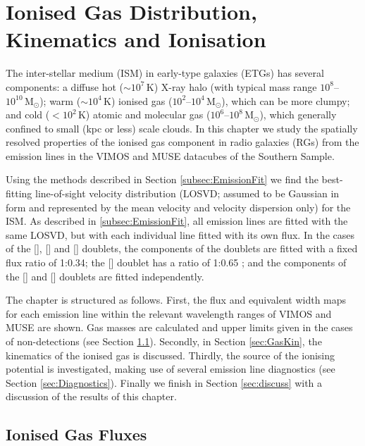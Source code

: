 \chapter{Ionised Gas Distribution, Kinematics and Ionisation}
	\label{cha:gas}
The inter-stellar medium (ISM) in early-type galaxies (ETGs) has several components: a diffuse hot ($\sim 10^7 \, \mathrm{K}$) X-ray halo (with typical mass range $10^8$--$10^{10} \, \mathrm{M_\odot}$); warm ($\sim 10^4 \, \mathrm{K}$) ionised gas ($10^2$--$10^4 \, \mathrm{M_\odot}$), which can be more clumpy; and cold ($<10^2 \, \mathrm{K}$) atomic and molecular gas ($10^6$--$10^8 \, \mathrm{M_\odot}$), which generally confined to small (kpc or less) scale clouds. In this chapter we study the spatially resolved properties of the ionised gas component in radio galaxies (RGs) from the emission lines in the VIMOS and MUSE datacubes of the Southern Sample.

Using the methods described in Section \ref{subsec:EmissionFit} we find the best-fitting line-of-sight velocity distribution (LOSVD; assumed to be Gaussian in form and represented by the mean velocity and velocity dispersion only) for the ISM. As described in \ref{subsec:EmissionFit}, all emission lines are fitted with the same LOSVD, but with each individual line fitted with its own flux. In the cases of the [], [] and [] doublets, the components of the doublets are fitted with a fixed flux ratio of 1:0.34; the [] doublet has a ratio of 1:0.65 \citep{Safier1992}; and the components of the [] and [] doublets are fitted independently.

The chapter is structured as follows. First, the flux and equivalent width maps for each emission line within the relevant wavelength ranges of VIMOS and MUSE are shown. Gas masses are calculated and upper limits given in the cases of non-detections (see Section \ref{sec:GasFlux}). Secondly, in Section \ref{sec:GasKin}, the kinematics of the ionised gas is discussed. Thirdly, the source of the ionising potential is investigated, making use of several emission line diagnostics (see Section \ref{sec:Diagnostics}). Finally we finish in Section \ref{sec:discuss} with a discussion of the results of this chapter.


\section{Ionised Gas Fluxes}
	\label{sec:GasFlux}
